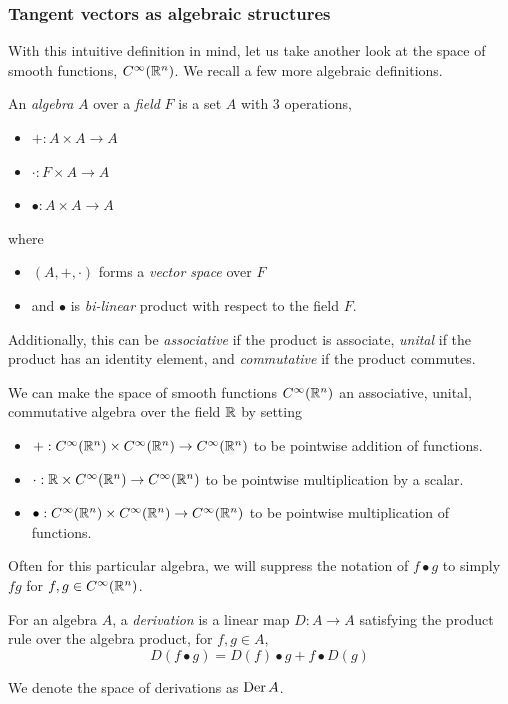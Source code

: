 \subsubsection{Tangent vectors as algebraic structures}
With this intuitive definition in mind, let us take another look at the space of smooth functions, \(C^\infty(\mathbb{R}^n)\).
We recall a few more algebraic definitions.
\begin{definition}
	An \emph{algebra} \(A\) over a \emph{field} \(F\) is a set \(A\) with 3 operations,
	\begin{itemize}
		\item[] \(+:A\times A\to A\)
		\item[] \(\cdot: F \times A \to A\)
		\item[] \(\bullet: A\times A\to A\)
	\end{itemize} where
	\begin{itemize}
		\item \((A, +, \cdot)\) forms a \emph{vector space} over \(F\) 
		\item and \(\bullet\) is \emph{bi-linear} product with respect to the field \(F\).
	\end{itemize}
\end{definition}
Additionally, this can be \emph{associative} if the product is associate, \emph{unital} if the product has an identity element, and \emph{commutative} if the product commutes.

We can make the space of smooth functions \(C^\infty(\mathbb{R}^n)\) an associative, unital, commutative algebra over the field \(\mathbb{R}\) by setting 
\begin{itemize}
	\item[] \(+: C^\infty(\mathbb{R}^n)\times C^\infty(\mathbb{R}^n) \to C^\infty(\mathbb{R}^n)\) to be pointwise addition of functions.
	\item[] \(\cdot: \mathbb{R} \times C^\infty(\mathbb{R}^n) \to C^\infty(\mathbb{R}^n) \) to be pointwise multiplication by a scalar.
	\item[] \(\bullet:C^\infty(\mathbb{R}^n)\times C^\infty(\mathbb{R}^n) \to C^\infty(\mathbb{R}^n) \) to be pointwise multiplication of functions.
\end{itemize}
Often for this particular algebra, we will suppress the notation of \(f \bullet g\) to simply \(fg\) for \(f, g \in C^\infty(\mathbb{R}^n)\).

\begin{definition}
	For an algebra \(A\), a \emph{derivation} is a linear map \(D: A\to A\) satisfying the product rule over the algebra product, for \(f, g \in A\),
	\[D(f \bullet g) = D(f)\bullet g + f \bullet D(g)\]	
\end{definition}
We denote the space of derivations as \(\operatorname{Der} A\).

